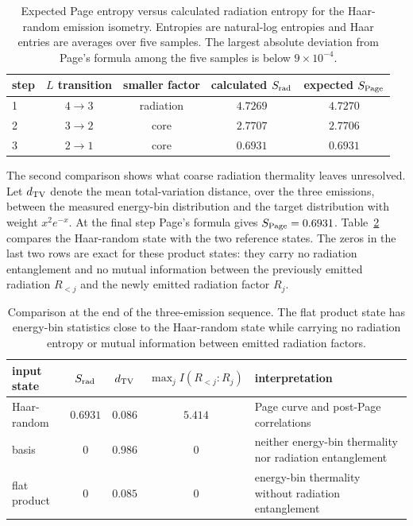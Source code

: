 \documentclass[12pt]{article}
\begin{document}
\begin{table}[H]
\centering
\small
\begin{tabular}{lcccc}
\toprule
step & $L$ transition & smaller factor & calculated $S_{\rm rad}$ & expected $S_{\rm Page}$ \\
\midrule
1 & $4\to3$ & radiation & $4.7269$ & $4.7270$ \\
2 & $3\to2$ & core & $2.7707$ & $2.7706$ \\
3 & $2\to1$ & core & $0.6931$ & $0.6931$ \\
\bottomrule
\end{tabular}
\caption{Expected Page entropy versus calculated radiation entropy for the
Haar-random emission isometry.  Entropies are natural-log entropies and Haar
entries are averages over five samples.  The largest absolute deviation from
Page's formula among the five samples is below $9\times10^{-4}$.}
\label{tab:page-check}
\end{table}

The second comparison shows what coarse radiation thermality leaves
unresolved.  Let $d_{\rm TV}$ denote the mean total-variation distance, over the
three emissions, between the measured energy-bin distribution and the target
distribution with weight $x^2e^{-x}$.  At the final step Page's formula gives
$S_{\rm Page}=0.6931$.  Table~\ref{tab:reference-state-check} compares the
Haar-random state with the two reference states.  The zeros in the last two
rows are exact for these product states: they carry no radiation entanglement
and no mutual information between the previously emitted radiation $R_{<j}$
and the newly emitted radiation factor $R_j$.

\begin{table}[H]
\centering
\small
\begin{tabular}{lcccp{2.05in}}
\toprule
input state
& $S_{\rm rad}$
& $d_{\rm TV}$
& $\max_j I(R_{<j}:R_j)$
& interpretation
\\
\midrule
Haar-random
& $0.6931$
& $0.086$
& $5.414$
& Page curve and post-Page correlations
\\
basis
& $0$
& $0.986$
& $0$
& neither energy-bin thermality nor radiation entanglement
\\
flat product
& $0$
& $0.085$
& $0$
& energy-bin thermality without radiation entanglement
\\
\bottomrule
\end{tabular}
\caption{Comparison at the end of the three-emission sequence.  The flat
product state has energy-bin statistics close to the Haar-random state while
carrying no radiation entropy or mutual information between emitted radiation
factors.}
\label{tab:reference-state-check}
\end{table}
\end{document}
